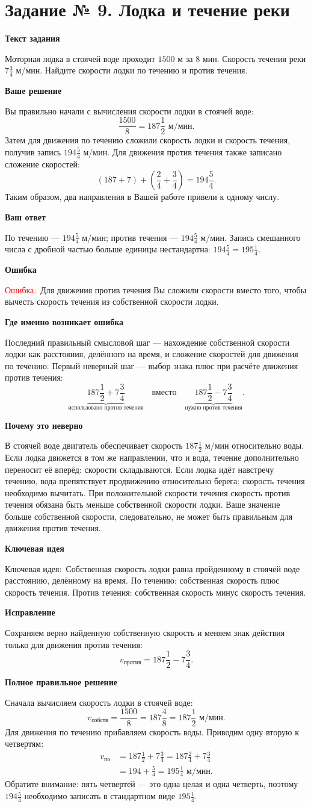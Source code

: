 \documentclass[12pt,a4paper]{article}
\newcommand{\err}{\textcolor{red}{Ошибка:}}
\newcommand{\idea}{\textcolor{blue!60!black}{Ключевая идея:}}
\newcommand{\subpart}[1]{\par\medskip\textbf{#1}\par\nopagebreak[2]}
\begin{document}
\label{task:9}
\section*{Задание № 9. Лодка и течение реки}
\subpart{Текст задания}
Моторная лодка в стоячей воде проходит $1500$ м за $8$ мин. Скорость течения реки $7\frac34$ м/мин. Найдите скорости лодки по течению и против течения.
\subpart{Ваше решение}
Вы правильно начали с вычисления скорости лодки в стоячей воде:
\[
\frac{1500}{8}=187\frac12\text{ м/мин}.
\]
Затем для движения по течению сложили скорость лодки и скорость течения, получив запись $194\frac54$ м/мин. Для движения против течения также записано сложение скоростей:
\[
(187+7)+\left(\frac24+\frac34\right)=194\frac54.
\]
Таким образом, два направления в Вашей работе привели к одному числу.
\subpart{Ваш ответ}
По течению --- $194\frac54$ м/мин; против течения --- $194\frac54$ м/мин. Запись смешанного числа с дробной частью больше единицы нестандартна: $194\frac54=195\frac14$.
\subpart{Ошибка}
\err\ Для движения против течения Вы сложили скорости вместо того, чтобы вычесть скорость течения из собственной скорости лодки.
\subpart{Где именно возникает ошибка}
Последний правильный смысловой шаг --- нахождение собственной скорости лодки как расстояния, делённого на время, и сложение скоростей для движения по течению. Первый неверный шаг --- выбор знака плюс при расчёте движения против течения:
\[
\underbrace{187\frac12+7\frac34}_{\text{использовано против течения}}
\quad\text{вместо}\quad
\underbrace{187\frac12-7\frac34}_{\text{нужно против течения}}.
\]
\subpart{Почему это неверно}
В стоячей воде двигатель обеспечивает скорость $187\frac12$ м/мин относительно воды. Если лодка движется в том же направлении, что и вода, течение дополнительно переносит её вперёд: скорости складываются. Если лодка идёт навстречу течению, вода препятствует продвижению относительно берега: скорость течения необходимо вычитать. При положительной скорости течения скорость против течения обязана быть меньше собственной скорости лодки. Ваше значение больше собственной скорости, следовательно, не может быть правильным для движения против течения.
\subpart{Ключевая идея}
\idea\ Собственная скорость лодки равна пройденному в стоячей воде расстоянию, делённому на время. По течению: собственная скорость плюс скорость течения. Против течения: собственная скорость минус скорость течения.
\subpart{Исправление}
Сохраняем верно найденную собственную скорость и меняем знак действия только для движения против течения:
\[
v_{\text{против}}=187\frac12-7\frac34.
\]
\subpart{Полное правильное решение}
Сначала вычисляем скорость лодки в стоячей воде:
\[
v_{\text{собств}}=\frac{1500}{8}=187\frac48=187\frac12\text{ м/мин}.
\]
Для движения по течению прибавляем скорость воды. Приводим одну вторую к четвертям:
\[
\begin{aligned}
v_{\text{по}}&=187\frac12+7\frac34
=187\frac24+7\frac34\\
&=194+\frac54
=195\frac14\text{ м/мин}.
\end{aligned}
\]
Обратите внимание: пять четвертей --- это одна целая и одна четверть, поэтому $194\frac54$ необходимо записать в стандартном виде $195\frac14$.
\end{document}

